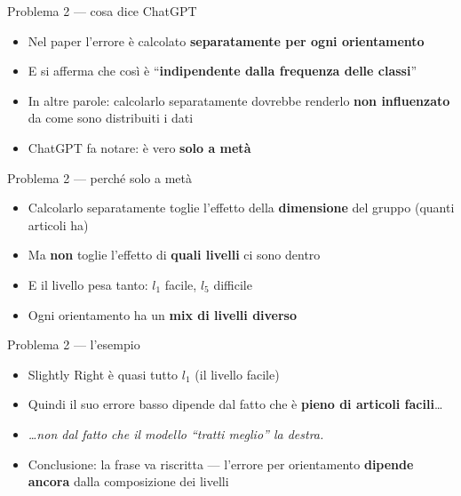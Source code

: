 \documentclass[aspectratio=169]{beamer}
\newcommand{\hl}[1]{\textbf{#1}}
\begin{document}
\begin{frame}{Problema 2 --- cosa dice ChatGPT}
  \vfill
  \begin{itemize}[<+->]
    \setlength\itemsep{0.9em}
    \item Nel paper l'errore \`e calcolato \hl{separatamente per ogni orientamento}
    \item E si afferma che cos\`i \`e ``\hl{indipendente dalla frequenza delle classi}''
    \item In altre parole: calcolarlo separatamente dovrebbe renderlo \hl{non influenzato} da come sono distribuiti i dati
    \item ChatGPT fa notare: \`e vero \hl{solo a met\`a}
  \end{itemize}
  \vfill
\end{frame}

\begin{frame}{Problema 2 --- perch\'e solo a met\`a}
  \vfill
  \begin{itemize}[<+->]
    \setlength\itemsep{0.9em}
    \item Calcolarlo separatamente toglie l'effetto della \hl{dimensione} del gruppo (quanti articoli ha)
    \item Ma \hl{non} toglie l'effetto di \hl{quali livelli} ci sono dentro
    \item E il livello pesa tanto: $l_1$ facile, $l_5$ difficile
    \item Ogni orientamento ha un \hl{mix di livelli diverso}
  \end{itemize}
  \vfill
\end{frame}

\begin{frame}{Problema 2 --- l'esempio}
  \vfill
  \begin{itemize}[<+->]
    \setlength\itemsep{0.9em}
    \item Slightly Right \`e quasi tutto $l_1$ (il livello facile)
    \item Quindi il suo errore basso dipende dal fatto che \`e \hl{pieno di articoli facili}\dots
    \item[] {\small\itshape \dots non dal fatto che il modello ``tratti meglio'' la destra.}
    \item Conclusione: la frase va riscritta --- l'errore per orientamento \hl{dipende ancora} dalla composizione dei livelli
  \end{itemize}
  \vfill
\end{frame}
\end{document}
